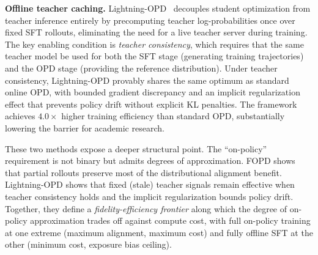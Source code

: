 \documentclass{article} %
\begin{document}
\textbf{Offline teacher caching.} Lightning-OPD~\citep{2604.13010} decouples student optimization from teacher inference entirely by precomputing teacher log-probabilities once over fixed SFT rollouts, eliminating the need for a live teacher server during training. The key enabling condition is \emph{teacher consistency}, which requires that the same teacher model be used for both the SFT stage (generating training trajectories) and the OPD stage (providing the reference distribution). Under teacher consistency, Lightning-OPD provably shares the same optimum as standard online OPD, with bounded gradient discrepancy and an implicit regularization effect that prevents policy drift without explicit KL penalties. The framework achieves $4.0\times$ higher training efficiency than standard OPD, substantially lowering the barrier for academic research.

These two methods expose a deeper structural point. The ``on-policy'' requirement is not binary but admits degrees of approximation. FOPD shows that partial rollouts preserve most of the distributional alignment benefit. Lightning-OPD shows that fixed (stale) teacher signals remain effective when teacher consistency holds and the implicit regularization bounds policy drift. Together, they define a \emph{fidelity-efficiency frontier} along which the degree of on-policy approximation trades off against compute cost, with full on-policy training at one extreme (maximum alignment, maximum cost) and fully offline SFT at the other (minimum cost, exposure bias ceiling).
\end{document}
